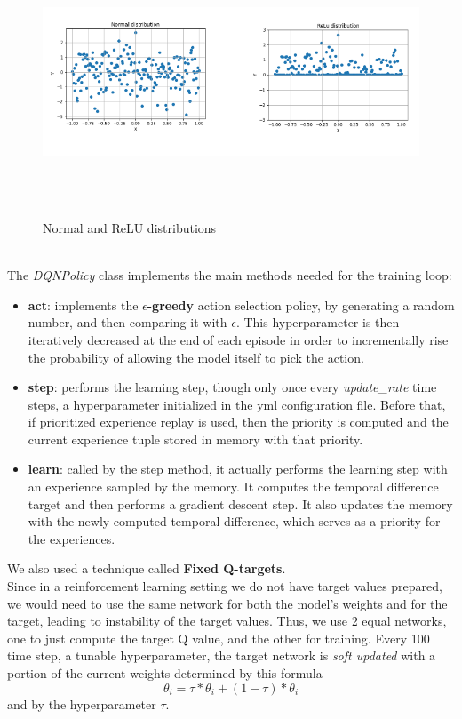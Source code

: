  \begin{figure}[H] 
\includegraphics[height=80mm, width=140mm, scale=0.5]{figures/relu_dist.png}
\centering
\caption{Normal and ReLU distributions}
\label{fig:s3} 
\end{figure}

\noindent
\\
The \textit{DQNPolicy} class implements the main methods needed for the training loop:
\begin{itemize}
\item \textbf{act}: implements the \textbf{$\epsilon$-greedy} action selection policy, by generating a random number, and then comparing it with $\epsilon$. This hyperparameter is then iteratively decreased at the end of each episode in order to incrementally rise the probability of allowing the model itself to pick the action.
\item \textbf{step}: performs the learning step, though only once every \textit{update\_rate} time steps, a hyperparameter initialized in the yml configuration file. Before that, if prioritized experience replay is used, then the priority is computed and the current experience tuple stored in memory with that priority.
\item \textbf{learn}: called by the step method, it actually performs the learning step with an experience sampled by the memory. It computes the temporal difference target and then performs a gradient descent step. It also updates the memory with the newly computed temporal difference, which serves as a priority for the experiences.
\end{itemize}

\noindent
We also used a technique called \textbf{Fixed Q-targets}.\\
Since in a reinforcement learning setting we do not have target values prepared, we would need to use the same network for both the model's weights and for the target, leading to instability of the target values. Thus, we use 2 equal networks, one to just compute the target Q value, and the other for training. Every 100 time step, a tunable hyperparameter, the target network is \textit{soft updated} with a portion of the current weights determined by this formula $$\theta_i = \tau * \theta_i + (1 - \tau) * \theta_i$$ and by the hyperparameter $\tau$. 

